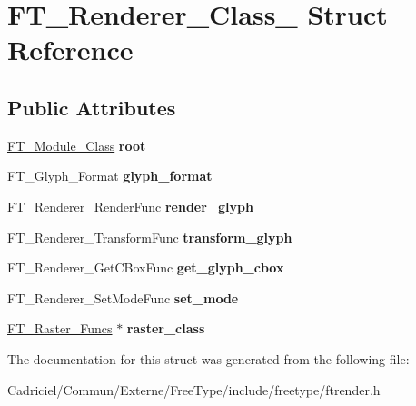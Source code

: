 \hypertarget{struct_f_t___renderer___class__}{}\section{F\+T\+\_\+\+Renderer\+\_\+\+Class\+\_\+ Struct Reference}
\label{struct_f_t___renderer___class__}
\subsection*{Public Attributes}
\begin{DoxyCompactItemize}
\item 
\hyperlink{struct_f_t___module___class__}{F\+T\+\_\+\+Module\+\_\+\+Class} {\bfseries root}\hypertarget{struct_f_t___renderer___class___a3df4509f1de704596bf4237d6ff8cbd4}{}\label{struct_f_t___renderer___class___a3df4509f1de704596bf4237d6ff8cbd4}

\item 
F\+T\+\_\+\+Glyph\+\_\+\+Format {\bfseries glyph\+\_\+format}\hypertarget{struct_f_t___renderer___class___a2c8602452fae27379a6f85bbcb4b525c}{}\label{struct_f_t___renderer___class___a2c8602452fae27379a6f85bbcb4b525c}

\item 
F\+T\+\_\+\+Renderer\+\_\+\+Render\+Func {\bfseries render\+\_\+glyph}\hypertarget{struct_f_t___renderer___class___a7a022b8358ce3a06620c62f3542d0d2b}{}\label{struct_f_t___renderer___class___a7a022b8358ce3a06620c62f3542d0d2b}

\item 
F\+T\+\_\+\+Renderer\+\_\+\+Transform\+Func {\bfseries transform\+\_\+glyph}\hypertarget{struct_f_t___renderer___class___a2aef09ecdabacf5628ef29fb3d179def}{}\label{struct_f_t___renderer___class___a2aef09ecdabacf5628ef29fb3d179def}

\item 
F\+T\+\_\+\+Renderer\+\_\+\+Get\+C\+Box\+Func {\bfseries get\+\_\+glyph\+\_\+cbox}\hypertarget{struct_f_t___renderer___class___a4f9dc9b6d86504a8d3b04b4e72936e76}{}\label{struct_f_t___renderer___class___a4f9dc9b6d86504a8d3b04b4e72936e76}

\item 
F\+T\+\_\+\+Renderer\+\_\+\+Set\+Mode\+Func {\bfseries set\+\_\+mode}\hypertarget{struct_f_t___renderer___class___a7cfd4795107157aad4f7efcab77a0f64}{}\label{struct_f_t___renderer___class___a7cfd4795107157aad4f7efcab77a0f64}

\item 
\hyperlink{struct_f_t___raster___funcs__}{F\+T\+\_\+\+Raster\+\_\+\+Funcs} $\ast$ {\bfseries raster\+\_\+class}\hypertarget{struct_f_t___renderer___class___a5af75b9f582f98f9f74dbcbc530c7e88}{}\label{struct_f_t___renderer___class___a5af75b9f582f98f9f74dbcbc530c7e88}

\end{DoxyCompactItemize}


The documentation for this struct was generated from the following file\+:\begin{DoxyCompactItemize}
\item 
Cadriciel/\+Commun/\+Externe/\+Free\+Type/include/freetype/ftrender.\+h\end{DoxyCompactItemize}

